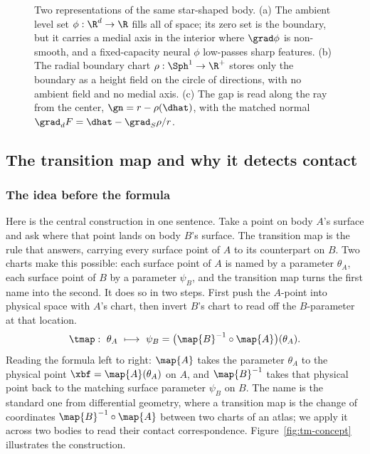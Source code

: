 \begin{figure}
{\begin{tikzpicture}[font=\footnotesize,>=Stealth,line join=round,
  starpts/.style={}]
\end{tikzpicture}%
}
\caption{Two representations of the same star-shaped body. (a) The ambient level set
$\phi:\R^d\to\R$ fills all of space; its zero set is the boundary, but it carries a medial axis in the
interior where $\grad\phi$ is non-smooth, and a fixed-capacity neural $\phi$ low-passes sharp features.
(b) The radial boundary chart $\rho:\Sph^{1}\to\R^+$ stores only the boundary as a height field on the
circle of directions, with no ambient field and no medial axis. (c) The gap is read along the ray from
the center, $\gn=r-\rho(\dhat)$, with the matched normal $\grad_d F=\dhat-\grad_S\rho/r$.}
\label{fig:tm-levelset-vs-chart}
\end{figure}

\subsection{The transition map and why it detects contact}\label{sec:tmap:def}

\subsubsection{The idea before the formula}

Here is the central construction in one sentence. Take a point on body $A$'s surface and ask where that
point lands on body $B$'s surface. The transition map is the rule that answers, carrying every surface
point of $A$ to its counterpart on $B$. Two charts make this possible: each surface point of $A$ is named
by a parameter $\theta_A$, each surface point of $B$ by a parameter $\psi_B$, and the transition map turns
the first name into the second. It does so in two steps. First push the $A$-point into physical space with
$A$'s chart, then invert $B$'s chart to read off the $B$-parameter at that location.
%
\begin{equation}\label{eq:tmap-def}
\tmap:\ \theta_A\ \longmapsto\ \psi_B=\big(\map{B}^{-1}\circ\map{A}\big)(\theta_A).
\end{equation}
%
Reading the formula left to right: $\map{A}$ takes the parameter $\theta_A$ to the physical point
$\xbf=\map{A}(\theta_A)$ on $A$, and $\map{B}^{-1}$ takes that physical point back to the matching surface
parameter $\psi_B$ on $B$. The name is the standard one from differential geometry, where a transition map
is the change of coordinates $\map{B}^{-1}\circ\map{A}$ between two charts of an atlas; we apply it across
two bodies to read their contact correspondence. Figure~\ref{fig:tm-concept} illustrates the construction.

